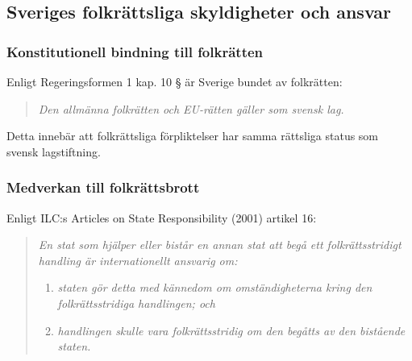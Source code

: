 %
%
%
%



\subsection{Sveriges folkrättsliga skyldigheter och ansvar}
\label{subsec:svenska_skyldigheter}

\subsubsection{Konstitutionell bindning till folkrätten}
Enligt Regeringsformen 1 kap. 10 § är Sverige bundet av folkrätten:
\begin{quote}
\textit{Den allmänna folkrätten och EU-rätten gäller som svensk lag.}
\end{quote}
Detta innebär att folkrättsliga förpliktelser har samma rättsliga status som svensk lagstiftning.

\subsubsection{Medverkan till folkrättsbrott}
Enligt ILC:s Articles on State Responsibility (2001) artikel 16:
\begin{quote}
\textit{En stat som hjälper eller bistår en annan stat att begå ett folkrättsstridigt handling är internationellt ansvarig om:}
\begin{enumerate}
\item \textit{staten gör detta med kännedom om omständigheterna kring den folkrättsstridiga handlingen; och}
\item \textit{handlingen skulle vara folkrättsstridig om den begåtts av den bistående staten.}
\end{enumerate}
\end{quote}

